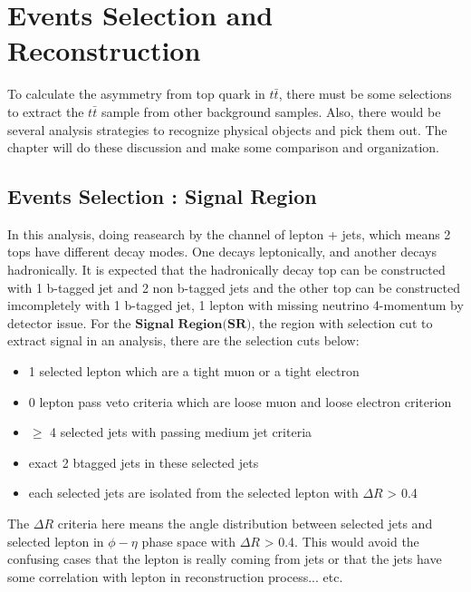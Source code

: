 

\section{Events Selection and Reconstruction}
\label{sec:EventSelReco}

	To calculate the asymmetry from top quark in $t\bar{t}$, there must be some selections to extract the $t\bar{t}$ sample from other background samples. Also, there would be several analysis strategies to recognize physical objects and pick them out. The chapter will do these discussion and make some comparison and organization.
	
	\subsection{Events Selection : Signal Region}
	\label{ssec:EvtSel_SR}

		In this analysis, doing reasearch by the channel of lepton + jets, which means 2 tops have different decay modes. One decays leptonically, and another decays hadronically. It is expected that the hadronically decay top can be constructed with 1 b-tagged jet and 2 non b-tagged jets and the other top can be constructed imcompletely with 1 b-tagged jet, 1 lepton with missing neutrino 4-momentum by detector issue. For the $\textbf{Signal Region(SR)}$, the region with selection cut to extract signal in an analysis, there are the selection cuts below:

		\begin{itemize}
  		\item 1 selected lepton which are a tight muon or a tight electron
  		\item 0 lepton pass veto criteria which are loose muon and loose electron criterion
  		\item $\geq$ 4 selected jets with passing medium jet criteria
  		\item exact 2 btagged jets in these selected jets
  		\item each selected jets are isolated from the selected lepton with $\Delta R$ > 0.4
		\end{itemize}

		The $\Delta R$ criteria here means the angle distribution between selected jets and selected lepton in $\phi - \eta$ phase space with $\Delta R$ > 0.4. This would avoid the confusing cases that the lepton is really coming from jets or that the jets have some correlation with lepton in reconstruction process... etc.

